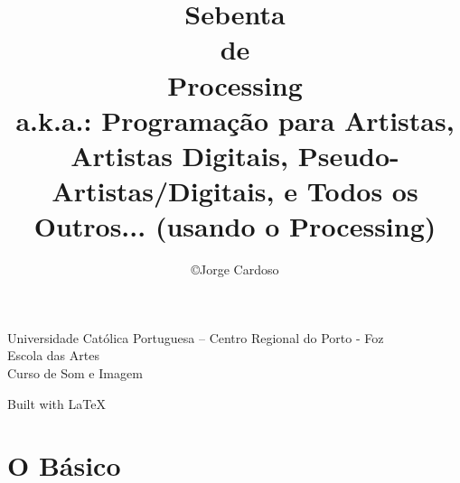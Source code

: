\documentclass[12pt, a4paper, twoside, notitlepage]{book}
\title{%
{\Huge Sebenta}\\%
de\\%
Processing\\%
{\small a.k.a.: Programação para Artistas, Artistas Digitais, Pseudo-Artistas/Digitais, e Todos os Outros... (usando o Processing)}\\%
}
\author{\copyright Jorge Cardoso}
\begin{document}
%
\renewcommand{\lstlistingname}{Exemplo}
\renewcommand{\lstlistlistingname}{Exemplos}

\frontmatter
\maketitle
\thispagestyle{empty}
\vfill
\noindent
Universidade Católica Portuguesa -- Centro Regional do Porto - Foz\\
Escola das Artes\\
Curso de Som e Imagem\\
\vfill
\begin{center}
Built with \LaTeX
\end{center}
\clearpage
\setcounter{page}{0}
\thispagestyle{empty}
\clearpage
\tableofcontents
\clearpage
\lstlistoflistings

%

\cleardoublepage

\mainmatter

\part{O Básico}





%




%
%
%
%
%
%
\end{document}
